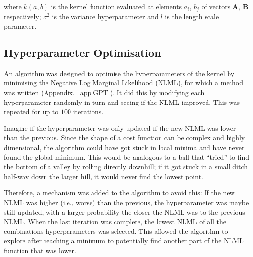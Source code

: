 \documentclass[12pt]{article}
\begin{document}
    \noindent where $k(a,b)$ is the kernel function evaluated at elements $a_i$, $b_j$ of vectors $\mathbf{A}$, $\mathbf{B}$ respectively; $\sigma^2$ is the variance hyperparameter and $l$ is the length scale parameter.


    \subsection{Hyperparameter Optimisation}
    An algorithm was designed to optimise the hyperparameters of the kernel by minimising the Negative Log Marginal Likelihood (NLML), for which a method was written (Appendix.~\ref{app:GPT}).
    It did this by modifying each hyperparameter randomly in turn and seeing if the NLML improved.
    This was repeated for up to $100$ iterations.

    Imagine if the hyperparameter was only updated if the new NLML was lower than the previous.
    Since the shape of a cost function can be complex and highly dimensional, the algorithm could have got stuck in local minima and have never found the global minimum.
    This would be analogous to a ball that ``tried'' to find the bottom of a valley by rolling directly downhill;
    if it got stuck in a small ditch half-way down the larger hill, it would never find the lowest point.

    Therefore, a mechanism was added to the algorithm to avoid this:
    If the new NLML was higher (i.e., worse) than the previous, the hyperparameter was maybe still updated, with a larger probability the closer the NLML was to the previous NLML\@.
    When the last iteration was complete, the lowest NLML of all the combinations hyperparameters was selected.
    This allowed the algorithm to explore after reaching a minimum to potentially find another part of the NLML function that was lower.
\end{document}

